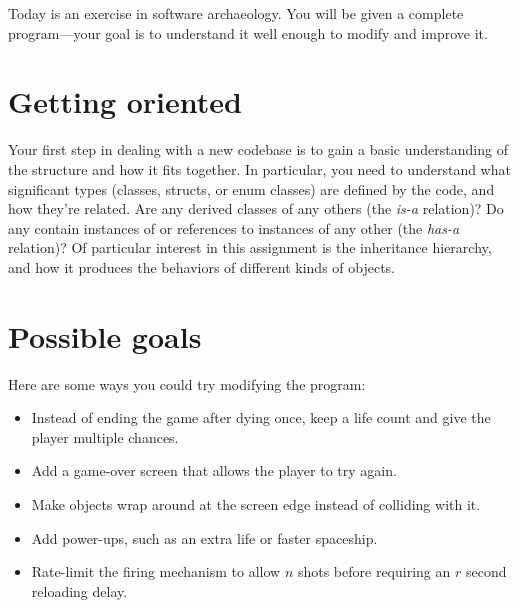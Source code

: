 \documentclass{tufte-handout}
\begin{document}
\maketitle

Today is an exercise in software archaeology. You will be given a
complete program---your goal is to understand it well enough to modify
and improve it.

\CxxPrelims

\section{Getting oriented}

Your first step in dealing with a new codebase is to gain a basic
understanding of the structure and how it fits together. In
particular, you need to understand what significant types (classes,
structs, or enum classes) are defined by the code, and how they're
related. Are any derived classes of any others (the \emph{is-a}
relation)? Do any contain instances of or references to instances of any
other (the \emph{has-a} relation)? Of particular interest in this
assignment is the inheritance hierarchy, and how it produces the
behaviors of different kinds of objects.

\section{Possible goals}

Here are some ways you could try modifying the program:

\begin{itemize}

  \item Instead of ending the game after dying once, keep a life count and
    give the player multiple chances.

   \item Add a game-over screen that allows the player to try again.

   \item Make  objects wrap around at
     the screen edge instead of colliding with it.

   \item Add  power-ups, such as an extra life or faster spaceship.

   \item Rate-limit the firing mechanism to allow $n$ shots before
     requiring an $r$ second reloading delay.

\end{itemize}
\end{document}
